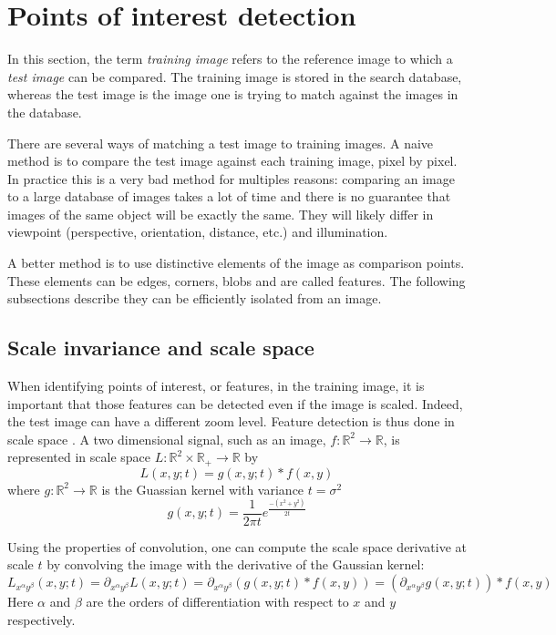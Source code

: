 \section{Points of interest detection}
\label{sec:feature_detection}

In this section, the term \emph{training image} refers to the reference image to which a \emph{test image} can be compared. The training image is stored in the search database, whereas the test image is the image one is trying to match against the images in the database.

There are several ways of matching a test image to training images. A naive method is to compare the test image against each training image, pixel by pixel. In practice this is a very bad method for multiples reasons: comparing an image to a large database of images takes a lot of time and there is no guarantee that images of the same object will be exactly the same. They will likely differ in viewpoint (perspective, orientation, distance, etc.) and illumination.

A better method is to use distinctive elements of the image as comparison points. These elements can be edges, corners, blobs and are called features. The following subsections describe they can be efficiently isolated from an image.

\subsection{Scale invariance and scale space}
\label{sec:scale_space}

When identifying points of interest, or features, in the training image, it is important that those features can be detected even if the image is scaled. Indeed, the test image can have a different zoom level. Feature detection is thus done in scale space \cite{Lindeberg98featuredetection}. A two dimensional signal, such as an image, $f: \mathbb{R}^2 \to \mathbb{R}$, is represented in scale space $L: \mathbb{R}^2 \times \mathbb{R}_+ \to \mathbb{R}$ by
\begin{equation}
L(x,y;t) = g(x,y;t) \ast f(x,y)
\end{equation}
where $g: \mathbb{R}^2 \to \mathbb{R}$ is the Guassian kernel with variance $t=\sigma^2$
\begin{equation}
g(x,y;t) = \frac{1}{2 \pi t} e ^ \frac{-(x^2+y^2)}{2t}
\end{equation}

Using the properties of convolution, one can compute the scale space derivative at scale $t$ by convolving the image with the derivative of the Gaussian kernel:
\begin{equation}
    L_{x^\alpha y^\beta} (x,y;t) = \partial _{x^\alpha y^\beta} L(x,y;t) = \partial _{x^\alpha y^\beta} (g(x,y;t) \ast f(x,y)) = (\partial _{x^\alpha y^\beta} g(x,y;t)) \ast f(x,y)
\end{equation}
Here $\alpha$ and $\beta$ are the orders of differentiation with respect to $x$ and $y$ respectively.

